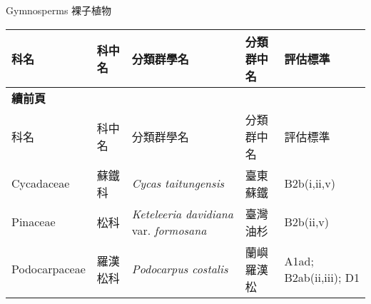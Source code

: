 \noindent\normalfont\selectfont Gymnosperms 裸子植物
\footnotesize\selectfont
        {\def\arraystretch{1.5}\tabcolsep=2pt
        \begin{longtable}{p{2.5cm}p{2.5cm}p{4.5cm}p{2.5cm}p{3cm}}
        \toprule
          科名 & 科中名 & 分類群學名 & 分類群中名 & 評估標準 \\
        \midrule 
        \endfirsthead

        {{\bfseries 續前頁 }} \\
        科名 & 科中名 & 分類群學名 & 分類群中名 & 評估標準 \\
        \midrule
        \endhead
                Cycadaceae & 蘇鐵科 & \textit{Cycas taitungensis}  & 臺東蘇鐵 & B2b(i,ii,v) \index{Cycas@\textit{Cycas}!taitungensis@\textit{taitungensis}}  \index{臺東蘇鐵} \\
    Pinaceae & 松科 & \textit{Keteleeria davidiana} var. \textit{formosana}  & 臺灣油杉 & B2b(ii,v) \index{Keteleeria@\textit{Keteleeria}!davidiana@\textit{davidiana}!var. formosana@var. \textit{formosana}}  \index{臺灣油杉} \\
    Podocarpaceae & 羅漢松科 & \textit{Podocarpus costalis}  & 蘭嶼羅漢松 & A1ad; B2ab(ii,iii); D1 \index{Podocarpus@\textit{Podocarpus}!costalis@\textit{costalis}}  \index{蘭嶼羅漢松} \\
    \bottomrule
        \end{longtable}
        }
    